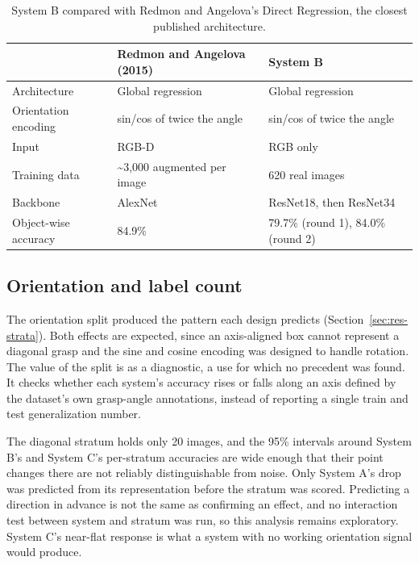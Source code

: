 \documentclass[12pt,letterpaper]{article}
\begin{document}
\begin{table}[H]
\centering
\caption{System B compared with Redmon and Angelova's Direct
Regression, the closest published architecture.}
\label{tab:redmon}
\begin{tabular}{lll}
\toprule
 & Redmon and Angelova (2015) & System B \\
\midrule
Architecture         & Global regression & Global regression \\
Orientation encoding & sin/cos of twice the angle
                     & sin/cos of twice the angle \\
Input                & RGB-D & RGB only \\
Training data        & \textasciitilde{}3,000 augmented per image
                     & 620 real images \\
Backbone             & AlexNet & ResNet18, then ResNet34 \\
Object-wise accuracy & 84.9\% & 79.7\% (round 1), 84.0\% (round 2) \\
\bottomrule
\end{tabular}
\end{table}

\subsection{Orientation and label count}

The orientation split produced the pattern each design predicts
(Section~\ref{sec:res-strata}). Both effects are expected, since an
axis-aligned box cannot represent a diagonal grasp and the sine and
cosine encoding was designed to handle rotation. The value of the split
is as a diagnostic, a use for which no precedent was found. It checks
whether each system's accuracy rises or falls along an axis defined by
the dataset's own grasp-angle annotations, instead of reporting a single
train and test generalization number.

The diagonal stratum holds only 20 images, and the 95\% intervals around
System B's and System C's per-stratum accuracies are wide enough that
their point changes there are not reliably distinguishable from noise.
Only System A's drop was predicted from its representation before the
stratum was scored. Predicting a direction in advance is not the same as
confirming an effect, and no interaction test between system and stratum
was run, so this analysis remains exploratory. System C's near-flat
response is what a system with no working orientation signal would
produce.
\end{document}
